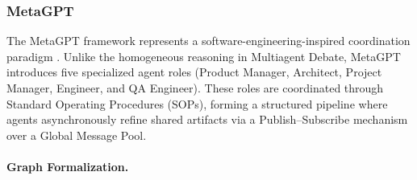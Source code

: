 
\subsubsection{MetaGPT}
The MetaGPT framework represents a software-engineering-inspired coordination paradigm \citep{hong2023metagpt}. Unlike the homogeneous reasoning in Multiagent Debate, MetaGPT introduces five specialized agent roles (Product Manager, Architect, Project Manager, Engineer, and QA Engineer). These roles are coordinated through Standard Operating Procedures (SOPs), forming a structured pipeline where agents asynchronously refine shared artifacts via a Publish–Subscribe mechanism over a Global Message Pool. 

\paragraph{Graph Formalization.}

